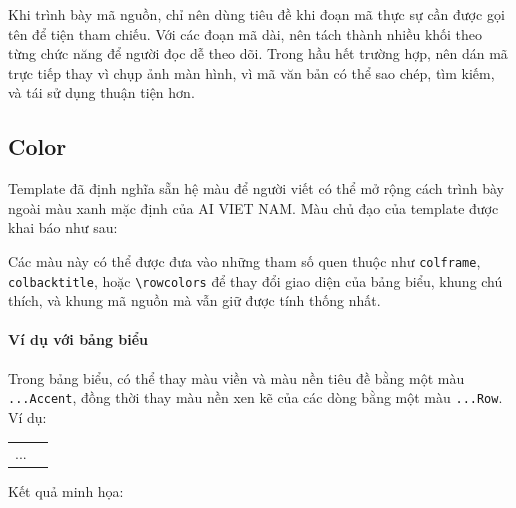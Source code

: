 \documentclass[12pt]{eDA_conquer2026}
\begin{document}
Khi trình bày mã nguồn, chỉ nên dùng tiêu đề khi đoạn mã thực sự cần được gọi tên để tiện
tham chiếu. Với các đoạn mã dài, nên tách thành nhiều khối theo từng chức năng để người đọc
dễ theo dõi. Trong hầu hết trường hợp, nên dán mã trực tiếp thay vì chụp ảnh màn hình, vì mã văn bản có thể sao chép, tìm kiếm, và tái sử dụng thuận tiện hơn.
\newpage
\subsection{Color}

Template đã định nghĩa sẵn hệ màu để người viết có thể mở rộng cách trình bày ngoài màu xanh mặc định của AI VIET NAM. Màu chủ đạo của template được khai báo như sau:

\begin{aivnoutputbox}
\end{aivnoutputbox}

Các màu này có thể được đưa vào những tham số quen thuộc như \verb|colframe|, \verb|colbacktitle|, hoặc \verb|\rowcolors| để thay đổi giao diện của bảng biểu, khung chú thích, và khung mã nguồn mà vẫn giữ được tính thống nhất.

\paragraph{Ví dụ với bảng biểu}

Trong bảng biểu, có thể thay màu viền và màu nền tiêu đề bằng một màu \verb|...Accent|, đồng thời thay màu nền xen kẽ của các dòng bằng một màu \verb|...Row|. Ví dụ:

\begin{aivnoutputbox}[]
\begin{tcolorbox}[
  colframe=aivnGreen,      %
  colbacktitle=aivnGreen,  %
  colback=white,
  boxrule=1pt,
  title=\textbf{Bảng thuật ngữ},
  fonttitle=\bfseries\color{white},
  halign title=center,
  arc=5pt
]
\renewcommand{\arraystretch}{1.5}
\renewcommand{\tabularxcolumn}[1]{m{#1}}
\begin{tabularx}{\linewidth}{>{\centering\arraybackslash}m{3.0cm} X}
...
\end{tabularx}
\end{tcolorbox}
\end{aivnoutputbox}

Kết quả minh họa:
\end{document}
